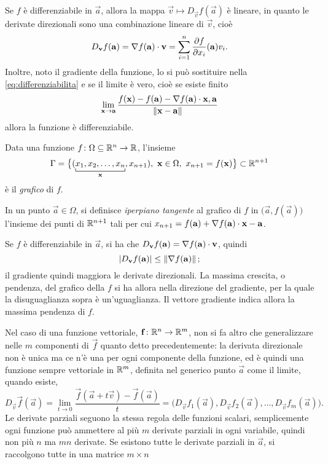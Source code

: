 Se $f$ è differenziabile in $\vec a$, allora la mappa $\vec v\mapsto D_{\vec v}f(\vec a)$ è lineare, in quanto le derivate direzionali sono una combinazione lineare di $\vec v$, cioè
\[
D_{\mathbf{v}}f(\mathbf{a})={\nabla f(\mathbf{a})}\cdot{\mathbf{v}}=\sum_{i=1}^n\frac{\partial {f}}{\partial {x_i}}(\mathbf{a})v_i.
\]
Inoltre, noto il gradiente della funzione, lo si può sostituire nella \eqref{eq:differenziabilita} e se il limite è vero, cioè se esiste finito
\[
\lim_{\mathbf{x}\to\mathbf{a}}\frac{f(\mathbf{x})-f(\mathbf{a})-{\nabla f(\mathbf{a})}\cdot{\mathbf{x},\mathbf{a}}}{\left\|{\mathbf{x}-\mathbf{a}}\right\|}
\]
allora la funzione è differenziabile.

\begin{definizione} \label{d:grafico-iperpiano}
Data una funzione $f\colon\Omega\subseteq\mathbb{R}^n\to\mathbb{R}$, l'insieme
\[
\Gamma=\big\{(\underbracket[.5pt]{x_1,x_2,\dots,x_n}_{\vec x},x_{n+1}),\ \vec x\in\Omega,\ x_{n+1}=f(\vec x)\big\}\subset\R^{n+1}
\]
è il \emph{grafico} di $f$.

In un punto $\vec a\in\Omega$, si definisce \emph{iperpiano tangente} al grafico di $f$ in $\big(\vec a,f(\vec a)\big)$ l'insieme dei punti di $\mathbb{R}^{n+1}$ tali per cui $x_{n+1}=f(\mathbf{a})+{\nabla f(\mathbf{a})}\cdot{\mathbf{x}-\mathbf{a}}$.
\end{definizione}
\begin{osservazione}
Se $f$ è differenziabile in $\vec a$, si ha che $D_{\mathbf{v}}f(\mathbf{a})={\nabla f(\mathbf{a})}\cdot{\mathbf{v}}$, quindi
\[
\left|{D_{\mathbf{v}}f(\mathbf{a})}\right|\leq\left\|{\nabla f(\mathbf{a})}\right\|;
\]
il gradiente quindi maggiora le derivate direzionali. La massima crescita, o pendenza, del grafico della $f$ si ha allora nella direzione del gradiente, per la quale la disuguaglianza sopra è un'uguaglianza. Il vettore gradiente indica allora la massima pendenza di $f$.
\end{osservazione}
Nel caso di una funzione vettoriale, $\mathbf{f}\colon\mathbb{R}^n\to\mathbb{R}^m$, non si fa altro che generalizzare nelle $m$ componenti di $\vec f$ quanto detto precedentemente: la derivata direzionale non è unica ma ce n'è una per ogni componente della funzione, ed è quindi una funzione sempre vettoriale in $\mathbb{R}^m$, definita nel generico punto $\vec a$ come il limite, quando esiste,
\[
D_{\vec v}\vec f(\vec a)=\lim_{t\to 0}\frac{\vec f(\vec a+t\vec v)-\vec f(\vec a)}{t}=\big(D_{\vec v}f_1(\vec a),D_{\vec v}f_2(\vec a),\dots,D_{\vec v}f_m(\vec a)\big).
\]
Le derivate parziali seguono la stessa regola delle funzioni scalari, semplicemente ogni funzione può ammettere al più $m$ derivate parziali in ogni variabile, quindi non più $n$ ma $mn$ derivate.
Se esistono tutte le derivate parziali in $\vec a$, si raccolgono tutte in una matrice $m\times n$
